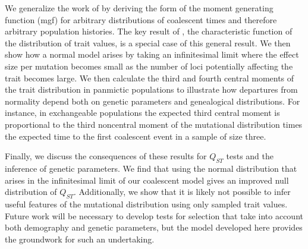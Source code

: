 We generalize the work of \citet{Schraiber2015} by deriving the form of the
moment generating function (mgf) for arbitrary distributions of coalescent times
and therefore arbitrary population histories. The key result
of \citet{Schraiber2015}, the characteristic function of the distribution of
trait values, is a special case of this general result. We then show how a
normal model arises by taking an infinitesimal limit where the effect size per
mutation becomes small as the number of loci potentially affecting the trait
becomes large. We then calculate the third and fourth central moments of the
trait distribution in panmictic populations to illustrate how departures from
normality depend both on genetic parameters and genealogical distributions. For
instance, in exchangeable populations the expected third central moment is
proportional to the third noncentral moment of the mutational distribution times
the expected time to the first coalescent event in a sample of size three.

Finally, we discuss the consequences of these results for $Q_{ST}$ tests and the
inference of genetic parameters. We find that using the normal distribution that
arises in the infinitesimal limit of our coalescent model gives an improved null
distribution of $Q_{ST}$. Additionally, we show that it is likely not possible
to infer useful features of the mutational distribution using only sampled trait
values. Future work will be necessary to develop tests for selection that take
into account both demography and genetic parameters, but the model developed
here provides the groundwork for such an undertaking.

